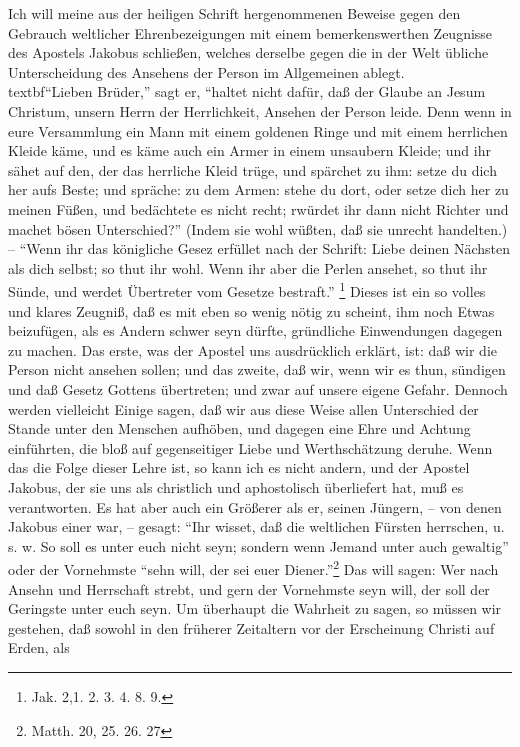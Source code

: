 Ich will meine aus der heiligen Schrift hergenommenen Beweise gegen den Gebrauch
weltlicher Ehrenbezeigungen mit einem bemerkenswerthen Zeugnisse des Apostels
Jakobus schließen, welches derselbe gegen die in der Welt übliche Unterscheidung
des Ansehens der Person im Allgemeinen ablegt.\\textbf{"`Lieben Brüder,"' sagt er,
"`haltet nicht dafür, daß der Glaube an Jesum Christum, unsern Herrn der
Herrlichkeit, Ansehen der Person leide. Denn wenn in eure Versammlung ein Mann
mit einem goldenen Ringe und mit einem herrlichen Kleide käme, und es käme auch
ein Armer in einem unsaubern Kleide; und ihr sähet auf den, der das herrliche
Kleid trüge, und spärchet zu ihm: setze du dich her aufs Beste; und spräche: zu
dem Armen: stehe du dort, oder setze dich her zu meinen Füßen, und bedächtete es
nicht recht; rwürdet ihr dann nicht Richter und machet bösen Unterschied?"'
(Indem sie wohl wüßten, daß sie unrecht handelten.) -- "`Wenn ihr das königliche
Gesez erfüllet nach der Schrift: Liebe deinen Nächsten als dich selbst; so thut
ihr wohl. Wenn ihr aber die Perlen ansehet, so thut ihr Sünde, und werdet
Übertreter vom Gesetze bestraft."'}
\footnote{Jak. 2,1. 2. 3. 4. 8. 9.} Dieses ist
ein so volles und klares Zeugniß, daß es mit eben so wenig nötig zu scheint, ihm
noch Etwas beizufügen, als es Andern schwer seyn dürfte, gründliche Einwendungen
dagegen zu machen. Das erste, was der Apostel uns ausdrücklich erklärt, ist: daß
wir die Person nicht ansehen sollen; und das zweite, daß wir, wenn wir es thun,
sündigen und daß Gesetz Gottens übertreten; und zwar auf unsere eigene Gefahr.
Dennoch werden vielleicht Einige sagen, daß wir aus diese Weise allen
Unterschied der Stande unter den Menschen aufhöben, und dagegen eine Ehre und
Achtung einführten, die bloß auf gegenseitiger Liebe und Werthschätzung deruhe.
Wenn das die Folge dieser Lehre ist, so kann ich es nicht andern, und der
Apostel Jakobus, der sie uns als christlich und aphostolisch überliefert hat,
muß es verantworten. Es hat aber auch ein Größerer als er, seinen Jüngern, --
von denen Jakobus einer war, -- gesagt: "`Ihr wisset, daß die weltlichen Fürsten
herrschen, u. s. w. So soll es unter euch nicht seyn; sondern wenn Jemand unter
auch gewaltig"' oder der Vornehmste "`sehn will, der sei euer
Diener."'\footnote{Matth. 20, 25. 26. 27} Das will sagen: Wer nach Ansehn und
Herrschaft strebt, und gern der Vornehmste seyn will, der soll der Geringste
unter euch seyn. Um überhaupt die Wahrheit zu sagen, so müssen wir gestehen, daß
sowohl in den früherer Zeitaltern vor der Erscheinung Christi auf Erden, als
